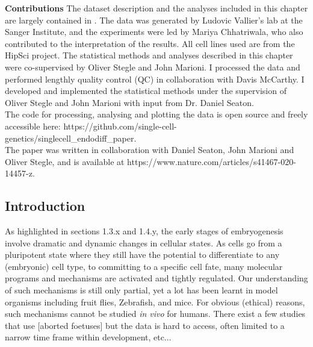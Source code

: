 \begin{Abstract}
\hspace{-3mm}\textbf{Contributions} The dataset description and the analyses included in this chapter are largely contained in \cite{cuomo2020single}. The data was generated by Ludovic Vallier’s lab at the Sanger Institute, and the experiments were led by Mariya Chhatriwala, who also contributed to the interpretation of the results. 
All cell lines used are from the HipSci project.
The statistical methods and analyses described in this chapter were co-supervised by Oliver Stegle and John Marioni. 
I processed the data and performed lengthly quality control (QC) in collaboration with Davis McCarthy. 
I developed and implemented the statistical methods under the supervision of Oliver Stegle and John Marioni with input from Dr. Daniel  Seaton.\\

The code for processing, analysing and plotting the data is open source and freely accessible here: https://github.com/single-cell-genetics/singlecell\_endodiff\_paper.\\ 

The paper was written in collaboration with Daniel Seaton, John Marioni and Oliver Stegle, and is available at https://www.nature.com/articles/s41467-020-14457-z.
\vfill
\end{Abstract}

\subsection{Introduction}

As highlighted in sections 1.3.x and 1.4.y, the early stages of embryogenesis involve dramatic and dynamic changes in cellular states. 
As cells go from a pluripotent state where they still have the potential to differentiate to any (embryonic) cell type, to committing to a specific cell fate, many molecular programs and mechanisms are activated and tightly regulated.
Our understanding of such mechanisms is still only partial, yet a lot has been learnt in model organisms including fruit flies, Zebrafish, and mice. For obvious (ethical) reasons, such mechanisms cannot be studied \textit{in vivo} for humans. There exist a few studies that use [aborted foetuses] but the data is hard to access, often limited to a narrow time frame within development, etc...\\

